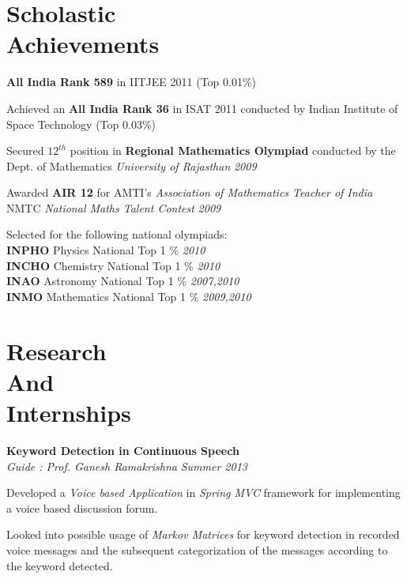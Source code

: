 \documentclass[margin,11pt]{resume}
\begin{document}
\begin{resume}

\vspace{25mm}

\section{\mysidestyle Scholastic\\Achievements}

\begin{list2}
\item \textbf{All India Rank 589} in IITJEE 2011 (Top 0.01\%)
\item Achieved an \textbf{All India Rank 36} in ISAT 2011 conducted by Indian Institute of Space Technology (Top 0.03\%)
\item Secured $12^{th}$ position in \textbf{Regional Mathematics Olympiad} conducted by the Dept. of Mathematics \emph{University of Rajasthan} \hfill \emph{2009}
\item Awarded \textbf{AIR 12} for AMTI's \emph{Association of Mathematics Teacher of India} NMTC \emph{National Maths Talent Contest} \hfill \emph{2009}
\item Selected for the following national olympiads: \\
 \textbf{  INPHO} Physics National Top 1 \% \hfill \emph{2010} \\
 \textbf{  INCHO} Chemistry National Top 1 \% \hfill \emph{2010} \\
 \textbf{  INAO} Astronomy National Top 1 \% \hfill \emph{2007,2010} \\
 \textbf{  INMO} Mathematics National Top 1 \% \hfill \emph{2009,2010} \\
\end{list2}
\section{\mysidestyle Research\\And\\Internships }
\textbf{Keyword Detection in Continuous Speech} \\
    \textsl{Guide : Prof. Ganesh Ramakrishna} \hfill \emph{Summer 2013}
\begin{list2}
\item Developed a \emph{Voice based Application} in \emph{Spring MVC} framework for implementing a voice based discussion forum. 
\item Looked into possible usage of \emph{Markov Matrices} for keyword detection in recorded voice messages and the subsequent categorization of the messages according to the keyword detected.
\end{list2}


\end{resume}
\end{document}
